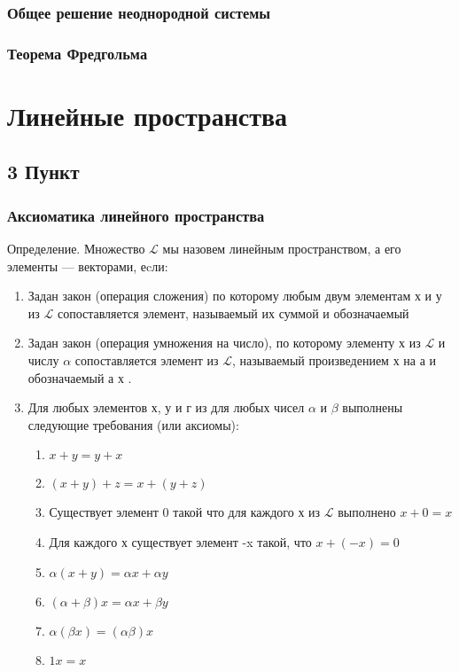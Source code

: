 \documentclass[11pt; a4paper]{report}
\theoremstyle{plain} %
\theoremstyle{defenition}
\theoremstyle{remark}
\begin{document}
\subsection{Общее решение неоднородной системы}
\subsection{Теорема Фредгольма}


\chapter{Линейные пространства}
\section{\Large 3 Пункт}
\subsection{Аксиоматика линейного пространства}
Определение. Множество $\mathscr{L}$ мы назовем линейным пространством, а его элементы — векторами, еcли:
\begin{enumerate}
\item Задан закон (операция сложения) по которому любым двум элементам х и у из  $\mathscr{L}$ сопоставляется элемент, называемый их суммой и обозначаемый 
\item Задан закон (операция умножения на число), по которому элементу х из $\mathscr{L}$ и числу $\alpha$ сопоставляется элемент из $\mathscr{L}$, называемый произведением х на а и обозна­чаемый а х .
\item Для любых элементов х, у и г из для любых чисел $\alpha$ и $\beta$ выполнены следующие требования (или аксиомы):
\begin{enumerate}
\item $x+y = y+x$
\item $(x + y) + z = x + (y + z)$
\item Существует элемент 0 такой что для каждого х из $\mathscr{L}$ выполнено $x + 0=x$
\item Для каждого х существует элемент -x такой, что $x + (-x) = 0$
\item $\alpha(x+y) = \alpha x + \alpha y$
\item $ (\alpha + \beta)x = \alpha x+\beta y$
\item $ \alpha( \beta x) = (\alpha \beta) x$
\item $1x = x$
\end{enumerate}
\end{enumerate}
\end{document}
